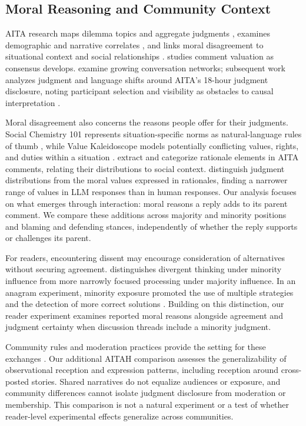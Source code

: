 \subsection{Moral Reasoning and Community Context}
\label{subsec:related-aita}

AITA research maps dilemma topics and aggregate judgments \cite{nguyen2022mapping,yudkin2025large}, examines demographic and narrative correlates \cite{decandia2022socialnorms,giorgi2023author}, and links moral disagreement to situational context and social relationships \cite{shi2025moral}. \citet{mellody2025consensus} studies comment valuation as consensus develops. \citet{goglia2024structure} examine growing conversation networks; subsequent work analyzes judgment and language shifts around AITA's 18-hour judgment disclosure, noting participant selection and visibility as obstacles to causal interpretation \cite{goglia2026influence}.

Moral disagreement also concerns the reasons people offer for their judgments. Social Chemistry 101 represents situation-specific norms as natural-language rules of thumb \cite{forbes2020social}, while Value Kaleidoscope models potentially conflicting values, rights, and duties within a situation \cite{sorensen2024value}. \citet{xi2024morality} extract and categorize rationale elements in AITA comments, relating their distributions to social context. \citet{russo2026pluralistic} distinguish judgment distributions from the moral values expressed in rationales, finding a narrower range of values in LLM responses than in human responses. Our analysis focuses on what emerges through interaction: moral reasons a reply adds to its parent comment. We compare these additions across majority and minority positions and blaming and defending stances, independently of whether the reply supports or challenges its parent.

For readers, encountering dissent may encourage consideration of alternatives without securing agreement. \citet{nemeth1986differential} distinguishes divergent thinking under minority influence from more narrowly focused processing under majority influence. In an anagram experiment, minority exposure promoted the use of multiple strategies and the detection of more correct solutions \cite{nemeth1987divergent}. Building on this distinction, our reader experiment examines reported moral reasons alongside agreement and judgment certainty when discussion threads include a minority judgment.

Community rules and moderation practices provide the setting for these exchanges \cite{fiesler2018rules,matias2019norms}. Our additional AITAH comparison assesses the generalizability of observational reception and expression patterns, including reception around cross-posted stories. Shared narratives do not equalize audiences or exposure, and community differences cannot isolate judgment disclosure from moderation or membership. This comparison is not a natural experiment or a test of whether reader-level experimental effects generalize across communities.
